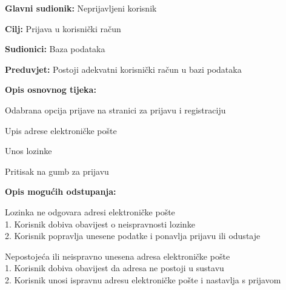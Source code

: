 					\noindent {}
					\begin{packed_item}
						\item \textbf{Glavni sudionik:} Neprijavljeni korisnik
						\item \textbf{Cilj:} Prijava u korisnički račun
						\item \textbf{Sudionici:} Baza podataka
						\item \textbf{Preduvjet:} Postoji adekvatni korisnički račun u bazi podataka
						\item \textbf{Opis osnovnog tijeka:}
						\begin{packed_enum}
							\item Odabrana opcija prijave na stranici za prijavu i registraciju
							\item Upis adrese elektroničke pošte
							\item Unos lozinke
							\item Pritisak na gumb za prijavu
						\end{packed_enum}
						\item \textbf{Opis mogućih odstupanja:}
						\begin{packed_item}
							\item[3.a] Lozinka ne odgovara adresi elektroničke pošte
							\\1. Korisnik dobiva obavijest o neispravnosti lozinke
							\\2. Korisnik popravlja unesene podatke i ponavlja prijavu ili odustaje
							\item[2.a] Nepostojeća ili neispravno unesena adresa elektroničke pošte
							\\1. Korisnik dobiva obavijest da adresa ne postoji u sustavu
							\\2. Korisnik unosi ispravnu adresu elektroničke pošte i nastavlja s prijavom
						\end{packed_item}
					\end{packed_item}
					
